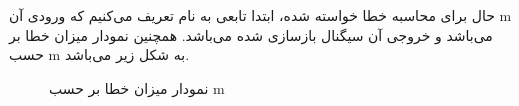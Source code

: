 \documentclass[10pt]{article}
\begin{document}
\noindent
حال برای محاسبه خطا خواسته شده، ابتدا تابعی به نام 
تعریف می‌کنیم که ورودی آن 
m
می‌باشد و خروجی آن سیگنال بازسازی شده می‌باشد. همچنین نمودار میزان خطا بر حسب m به شکل زیر می‌باشد.
\begin{figure}[h]
	\begin{center}
		\hspace{1cm}	
	\end{center}
	\caption{نمودار میزان خطا بر حسب m}
\end{figure}
\newpage
\end{document}
